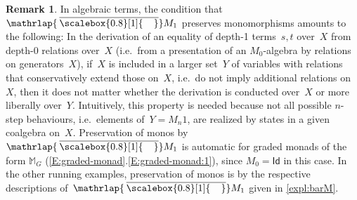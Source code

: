 \documentclass[sigconf,
			final%
			nonacm
                        ]{acmart}
\numberwithin{equation}{section}
\numberwithin{equation}{section}
\theoremstyle{plain}
\theoremstyle{definition}
\newtheorem{rem}[thm]{Remark}
\newcommand{\mybar}[3]{%
  \mathrlap{\hspace{#2}\overline{\scalebox{#1}[1]{\hphantom{\ensuremath{#3}}\vphantom{\rule{0pt}{5.5pt}}}}}\ensuremath{#3}
}
\newcommand{\barM}{\mybar{0.8}{2pt}{M}_1}
\newcommand{\M}{\mathbb{M}}                   %
\newcommand{\A}{\mathcal{A}}            %
\newcommand{\Id}{\mathsf{Id}}                 %
\begin{document}
\begin{rem}\label{rem:monos}
  In algebraic terms, the condition that~$\barM$ preserves
  monomorphisms amounts to the following: In the derivation of an
  equality of depth-1 terms~$s,t$ over~$X$ from depth-0 relations
  over~$X$ (i.e.~from a presentation of an $M_0$-algebra by relations
  on generators~$X$), if~$X$ is included in a larger set~$Y$ of
  variables with relations that conservatively extend those on~$X$,
  i.e.~do not imply additional relations on~$X$, then it does not
  matter whether the derivation is conducted over~$X$ or more
  liberally over~$Y$. Intuitively, this property is needed because not
  all possible $n$-step behaviours, i.e.~elements of~$Y=M_n1$, are
  realized by states in a given coalgebra on~$X$. Preservation of
  monos by~$\barM$ is automatic for graded monads of the form $\M_G$
  (\cref{E:graded-monad}.\ref{E:graded-monad:1}), since $M_0=\Id$
  in this case. In the other running examples, preservation of monos
  is by the respective descriptions of~$\barM$ given in
  \cref{expl:barM}.
\end{rem}
\end{document}
